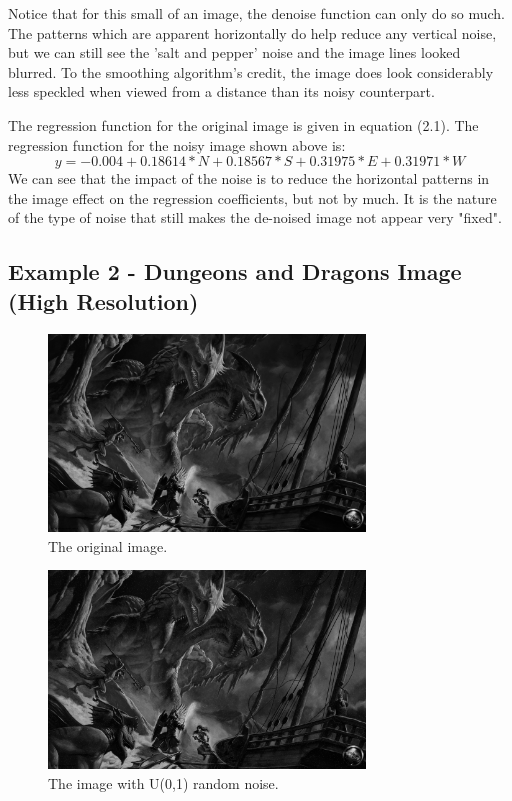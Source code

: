 \documentclass{article}
\begin{document}
Notice that for this small of an image, the denoise function can only do so much.  The patterns which are apparent horizontally do help reduce any vertical noise, but we can still see the 'salt and pepper' noise and the image lines looked blurred.  To the smoothing algorithm's credit, the image does look considerably less speckled when viewed from a distance than its noisy counterpart.

The regression function for the original image is given in equation (2.1).  The regression function for the noisy image shown above is:
\begin{equation}
y = -0.004 + 0.18614 * N + 0.18567 * S + 0.31975 * E + 0.31971 * W
\end{equation}
We can see that the impact of the noise is to reduce the horizontal patterns in the image effect on the regression coefficients, but not by much.  It is the nature of the type of noise that still makes the de-noised image not appear very "fixed".

\subsection{Example 2 - Dungeons and Dragons Image (High Resolution)}

\begin{figure}[H]
    \begin{center}
        \includegraphics[width=0.75\textwidth]{dragon.jpg}
    \end{center}
  \caption{The original image.}
\end{figure}

\begin{figure}[H]
    \begin{center}
        \includegraphics[width=0.75\textwidth]{noised_dragon.jpg}
    \end{center}
  \caption{The image with U(0,1) random noise.}
\end{figure}
\end{document}
